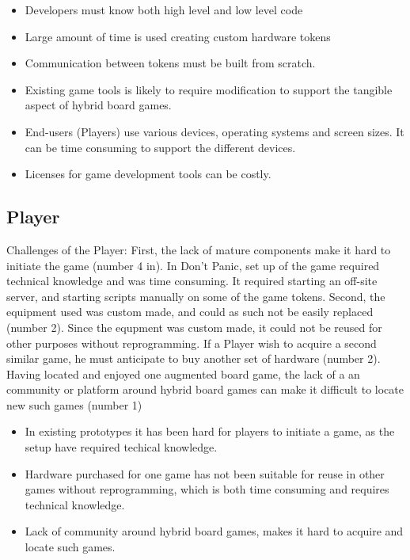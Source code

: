 \begin{itemize}
\item Developers must know both high level and low level code
\item Large amount of time is used creating custom hardware tokens
\item Communication between tokens must be built from scratch.
\item Existing game tools is likely to require modification to support the tangible aspect of hybrid board games.
\item End-users (Players) use various devices, operating systems and screen sizes. It can be time consuming to support the different devices.
\item Licenses for game development tools can be costly.
\end{itemize}

\subsection{Player}
Challenges of the Player: First, the lack of mature components make it hard to initiate the game (number 4 in). In Don't Panic, set up of the game required technical knowledge and was time consuming. It required starting an off-site server, and starting scripts manually on some of the game tokens. Second, the equipment used was custom made, and could as such not be easily replaced (number 2).  Since the equpment was custom made, it could not be reused for other purposes without reprogramming. If a Player wish to acquire a second similar game, he must anticipate to buy another set of hardware (number 2). Having located and enjoyed one augmented board game, the lack of a an community or platform around hybrid board games can make it difficult to locate new such games (number 1)

\begin{itemize}
\item In existing prototypes it has been hard for players to initiate a game, as the setup have required techical knowledge.
\item Hardware purchased for one game has not been suitable for reuse in other games without reprogramming, which is both time consuming and requires technical knowledge.
\item Lack of community around hybrid board games, makes it hard to acquire and locate such games.
\end{itemize}
